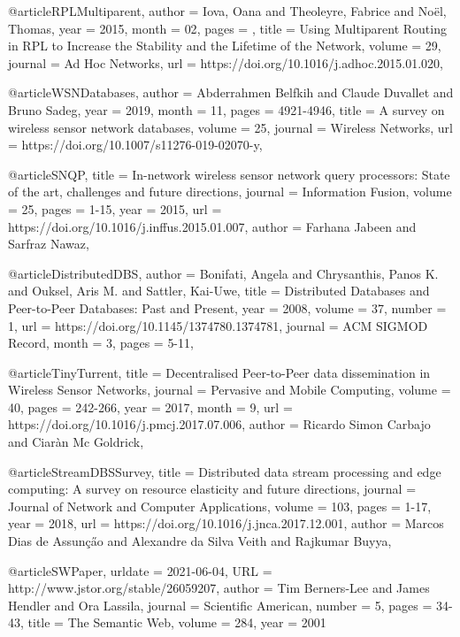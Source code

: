 \documentclass[english,version-2019-11]{uzl-thesis}
\begin{document}
\begin{bibtex-entries}
@article{RPLMultiparent,
    author = {Iova, Oana and Theoleyre, Fabrice and Noël, Thomas},
    year = {2015},
    month = {02},
    pages = {},
    title = {Using Multiparent Routing in RPL to Increase the Stability and the Lifetime of the Network},
    volume = {29},
    journal = {Ad Hoc Networks},
    url = {https://doi.org/10.1016/j.adhoc.2015.01.020},
}

@article{WSNDatabases,
    author = {Abderrahmen Belfkih and Claude Duvallet and Bruno Sadeg},
    year = {2019},
    month = {11},
    pages = {4921-4946},
    title = {A survey on wireless sensor network databases},
    volume = {25},
    journal = {Wireless Networks},
    url = {https://doi.org/10.1007/s11276-019-02070-y},
}

@article{SNQP,
    title = {In-network wireless sensor network query processors: State of the art, challenges and future directions},
    journal = {Information Fusion},
    volume = {25},
    pages = {1-15},
    year = {2015},
    url = {https://doi.org/10.1016/j.inffus.2015.01.007},
    author = {Farhana Jabeen and Sarfraz Nawaz},
}

@article{DistributedDBS,
    author = {Bonifati, Angela and Chrysanthis, Panos K. and Ouksel, Aris M. and Sattler, Kai-Uwe},
    title = {Distributed Databases and Peer-to-Peer Databases: Past and Present},
    year = {2008},
    volume = {37},
    number = {1},
    url = {https://doi.org/10.1145/1374780.1374781},
    journal = {ACM SIGMOD Record},
    month = {3},
    pages = {5-11},
}

@article{TinyTurrent,
    title = {Decentralised Peer-to-Peer data dissemination in Wireless Sensor Networks},
    journal = {Pervasive and Mobile Computing},
    volume = {40},
    pages = {242-266},
    year = {2017},
    month = {9},
    url = {https://doi.org/10.1016/j.pmcj.2017.07.006},
    author = {Ricardo Simon Carbajo and Ciar\`{a}n Mc Goldrick},
}

@article{StreamDBSSurvey,
    title = {Distributed data stream processing and edge computing: A survey on resource elasticity and future directions},
    journal = {Journal of Network and Computer Applications},
    volume = {103},
    pages = {1-17},
    year = {2018},
    url = {https://doi.org/10.1016/j.jnca.2017.12.001},
    author = {Marcos {Dias de Assun\c{c}\H{a}o} and Alexandre {da Silva Veith} and Rajkumar Buyya},
}

@article{SWPaper,
    urldate =  {2021-06-04},
    URL = {http://www.jstor.org/stable/26059207},
    author = {Tim Berners-Lee and James Hendler and Ora Lassila},
    journal = {Scientific American},
    number = {5},
    pages = {34-43},
    title = {The Semantic Web},
    volume = {284},
    year = {2001}
}


\end{bibtex-entries}
\end{document}
